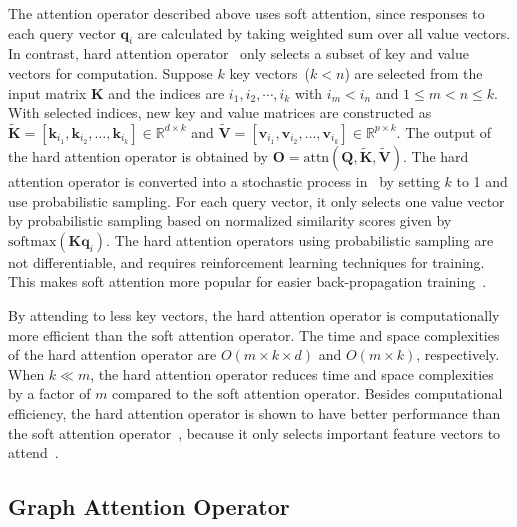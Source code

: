 \documentclass[sigconf]{acmart}
\begin{document}
The attention operator described above uses soft attention, since
responses to each query vector $\boldsymbol q_i$ are calculated by
taking weighted sum over all value vectors. In contrast, hard
attention operator~\cite{xu2015show} only selects a subset of key
and value vectors for computation. Suppose $k$ key vectors~($k < n$)
are selected from the input matrix $\boldsymbol K$ and the indices
are $i_1, i_2, \cdots, i_k$ with $i_m < i_n$ and $1 \le m < n \le
k$. With selected indices, new key and value matrices are
constructed as $\boldsymbol{\tilde K} = [\mathbf{k}_{i_1},
\mathbf{k}_{i_2}, \ldots, \mathbf{k}_{i_k}] \in \mathbb{R}^{d\times
k}$ and $\boldsymbol{\tilde V} = [\mathbf{v}_{i_1},
\mathbf{v}_{i_2}, \ldots, \mathbf{v}_{i_k}] \in \mathbb{R}^{p\times
k}$. The output of the hard attention operator is obtained by
$\boldsymbol O =
\mbox{attn}(\boldsymbol Q, \boldsymbol{\tilde K}, \boldsymbol{\tilde V})$.
The hard attention operator is converted into a stochastic process
in~\cite{xu2015show} by setting $k$ to 1 and use probabilistic
sampling. For each query vector, it only selects one value vector by
probabilistic sampling based on normalized similarity scores given
by $\mbox{softmax}(\boldsymbol K \boldsymbol q_i)$. The hard
attention operators using probabilistic sampling are not
differentiable, and requires reinforcement learning techniques for
training. This makes soft attention more popular for easier
back-propagation training~\cite{ling2017coarse}.

By attending to less key vectors, the hard attention operator is
computationally more efficient than the soft attention operator. The
time and space complexities of the hard attention operator are $O(m
\times k \times d)$ and $O(m\times k)$, respectively. When $k \ll
m$, the hard attention operator reduces time and space complexities
by a factor of $m$ compared to the soft attention operator. Besides
computational efficiency, the hard attention operator is shown to
have better performance than the soft attention
operator~\cite{xu2015show,luong2015effective}, because it only selects
important feature vectors to
attend~\cite{malinowski2018learning,juefei2016deepgender}.

\subsection{Graph Attention Operator}
\end{document}

